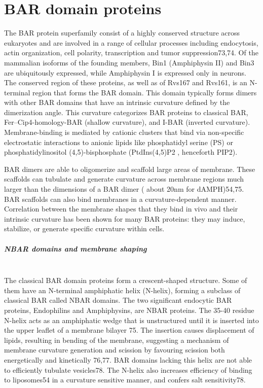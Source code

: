 		
\section{BAR domain proteins}
	
The BAR protein superfamily consist of a highly conserved structure across eukaryotes and are involved in a range of cellular processes including endocytosis, actin organization, cell polarity, transcription and tumor suppression73,74. 
\vspace{5mm}
Of the mammalian isoforms of the founding members, Bin1 (Amphiphysin II) and Bin3 are ubiquitously expressed, while Amphiphysin I is expressed only in neurons. The conserved region of these proteins, as well as of Rvs167 and Rvs161, is an N-terminal region that forms the BAR domain. This domain typically forms dimers with other BAR domains that have an intrinsic curvature defined by the dimerization angle. This curvature categorizes BAR proteins to classical BAR, Fer–Cip4-homology-BAR (shallow curvature), and I-BAR (inverted curvature). Membrane-binding is mediated by cationic clusters that bind via non-specific electrostatic interactions to anionic lipids like phosphatidyl serine (PS) or phosphatidylinositol (4,5)-bisphosphate (PtdIns(4,5)P2 , henceforth PIP2).

\vspace{5mm}
BAR dimers are able to oligomerize and scaffold large areas of membrane. These scaffolds can tubulate and generate curvature across membrane regions much larger than the dimensions of a BAR dimer ( about 20nm for dAMPH)54,75. BAR scaffolds can also bind membranes in a curvature-dependent manner. Correlation between the membrane shapes that they bind in vivo and their intrinsic curvature has been shown for many BAR proteins: they may induce, stabilize, or generate specific curvature within cells. 


	\subparagraph{NBAR domains and membrane shaping}
	\mbox{} \\
	The classical BAR domain proteins form a crescent-shaped structure. Some of them have an N-terminal amphiphatic helix (N-helix), forming a subclass of classical BAR called NBAR domains. The two significant endocytic BAR proteins, Endophilins and Amphiphysins, are NBAR proteins. The 35-40 residue N-helix acts as an amphiphatic wedge that is unstructured until it is inserted into the upper leaflet of a membrane bilayer 75. The insertion causes displacement of lipids, resulting in bending of the membrane, suggesting a mechanism of membrane curvature generation and scission by favouring scission both energetically and kinetically 76,77. BAR domains lacking this helix are not able to efficiently tubulate vesicles78. The N-helix also increases efficiency of binding to liposomes54 in a curvature sensitive manner, and confers salt sensitivity78. 

